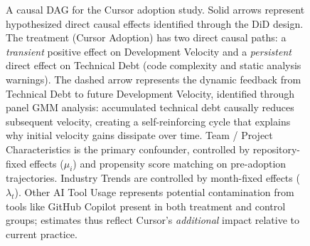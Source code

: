 \begin{figure}[t]
\centering
{}
\caption{A causal DAG for the Cursor adoption study.
Solid arrows represent hypothesized direct causal effects identified through the DiD design.
The treatment (Cursor Adoption) has two direct causal paths: a \emph{transient} positive effect on Development Velocity and a \emph{persistent} direct effect on Technical Debt (code complexity and static analysis warnings).
The dashed arrow represents the dynamic feedback from Technical Debt to future Development Velocity, identified through panel GMM analysis: accumulated technical debt causally reduces subsequent velocity, creating a self-reinforcing cycle that explains why initial velocity gains dissipate over time.
Team / Project Characteristics is the primary confounder, controlled by repository-fixed effects ($\mu_i$) and propensity score matching on pre-adoption trajectories.
Industry Trends are controlled by month-fixed effects ($\lambda_t$).
Other AI Tool Usage represents potential contamination from tools like GitHub Copilot present in both treatment and control groups; estimates thus reflect Cursor's \emph{additional} impact relative to current practice.}\label{fig:cursor-dag}
\end{figure}

